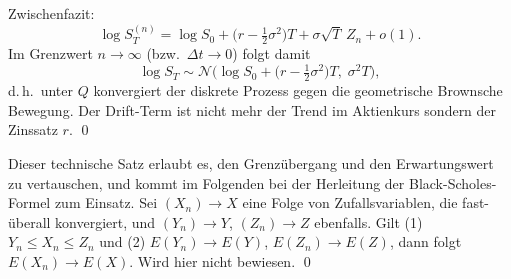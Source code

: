Zwischenfazit:
$$
\log S_T^{(n)}
= \log S_0 + \big(r - \tfrac12 \sigma^2\big)T + \sigma \sqrt{T}\,Z_n + o(1).
$$
Im Grenzwert $n\to\infty$ (bzw.\ $\Delta t \to 0$) folgt damit
$$
\log S_T \sim \mathcal N\!\Big(\log S_0 + \big(r - \tfrac12 \sigma^2\big)T,\;\sigma^2 T\Big),
$$
d.\,h.\ unter $Q$ konvergiert der diskrete Prozess gegen die geometrische Brownsche Bewegung. Der Drift-Term ist nicht mehr der
Trend im Aktienkurs sondern der Zinssatz $r$.
\qed

\begin{satz}
Dieser technische Satz erlaubt es, den Grenzübergang und den Erwartungswert zu vertauschen, und
kommt im Folgenden bei der Herleitung der Black-Scholes-Formel zum Einsatz.
Sei $(X_n) \longrightarrow X$ eine Folge von Zufallsvariablen, die fast-überall konvergiert,
und $(Y_n) \longrightarrow Y$, $(Z_n) \longrightarrow Z$ ebenfalls.
Gilt (1) $Y_n \le X_n \le Z_n$ und (2) $E(Y_n) \longrightarrow E(Y)$, $E(Z_n) \longrightarrow E(Z)$,
dann folgt $E(X_n) \longrightarrow E(X)$. Wird hier nicht bewiesen. \qed
\end{satz}

